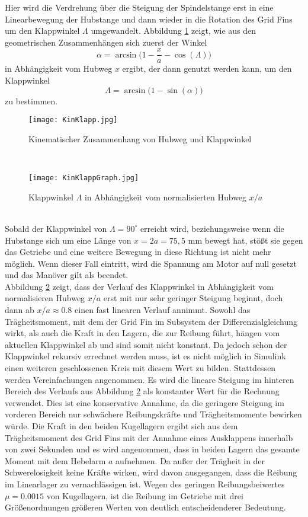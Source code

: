 Hier wird die Verdrehung über die Steigung der Spindelstange erst in eine Linearbewegung der Hubstange und dann wieder in die Rotation des Grid Fins um den Klappwinkel $\Lambda$ umgewandelt. Abbildung \ref{abb_kinklapp} zeigt, wie aus den geometrischen Zusammenhängen sich zuerst der Winkel
\begin{equation}
	\alpha=\arcsin\bigg(1-\frac{x}{a}-\cos(\Lambda)\bigg)
\end{equation}
in Abhängigkeit vom Hubweg $x$ ergibt, der dann genutzt werden kann, um den Klappwinkel
\begin{equation}
	\Lambda = \arcsin\bigg(1-\sin(\alpha)\bigg)
\end{equation}
zu bestimmen.
\begin{figure}[h] 
	\centering
	\texttt{[image: KinKlapp.jpg]}
	\caption{Kinematischer Zusammenhang von Hubweg und Klappwinkel}
	\label{abb_kinklapp}
\end{figure}\\
\begin{figure}[h] 
	\centering
	\texttt{[image: KinKlappGraph.jpg]}
	\caption{Klappwinkel $\Lambda$ in Abhängigkeit vom normalisierten Hubweg $x/a$}
	\label{abb_KinKlappGraph}
\end{figure}\\	
Sobald der Klappwinkel von $\Lambda = 90^\circ$ erreicht wird, beziehungsweise wenn die Hubstange sich um eine Länge von $x = 2a = 75,5$ mm bewegt hat, stößt sie gegen das Getriebe und eine weitere Bewegung in diese Richtung ist nicht mehr möglich. Wenn dieser Fall eintritt, wird die Spannung am Motor auf null gesetzt und das Manöver gilt als beendet.
\\
Abbildung \ref{abb_KinKlappGraph} zeigt, dass der Verlauf des Klappwinkel in Abhängigkeit vom normalisieren Hubweg $x/a$ erst mit nur sehr geringer Steigung beginnt, doch dann ab $x/a \approx 0.8$ einen fast linearen Verlauf annimmt. Sowohl das Trägheitsmoment, mit dem der Grid Fin im Subsystem der Differenzialgleichung wirkt, als auch die Kraft in den Lagern, die zur Reibung führt, hängen vom aktuellen Klappwinkel ab und sind somit nicht konstant. Da jedoch schon der Klappwinkel rekursiv errechnet werden muss, ist es nicht möglich in Simulink einen weiteren geschlossenen Kreis mit diesem Wert zu bilden. Stattdessen werden Vereinfachungen angenommen. Es wird die lineare Steigung im hinteren Bereich des Verlaufs aus Abbildung \ref{abb_KinKlappGraph} als konstanter Wert für die Rechnung verwendet. Dies ist eine konservative Annahme, da die geringere Steigung im vorderen Bereich nur schwächere Reibungskräfte und Trägheitsmomente bewirken würde. Die Kraft in den beiden Kugellagern ergibt sich aus dem Trägheitsmoment des Grid Fins mit der Annahme eines Ausklappens innerhalb von zwei Sekunden und es wird angenommen, dass in beiden Lagern das gesamte Moment mit dem Hebelarm $a$ aufnehmen. Da außer der Trägheit in der Schwerelosigkeit keine Kräfte wirken, wird davon ausgegangen, dass die Reibung im Linearlager zu vernachlässigen ist. Wegen des geringen Reibungsbeiwertes $\mu = 0.0015$ \cite{lagerreibung} von Kugellagern, ist die Reibung im Getriebe mit drei Größenordnungen größeren Werten von deutlich entscheidenderer Bedeutung.
